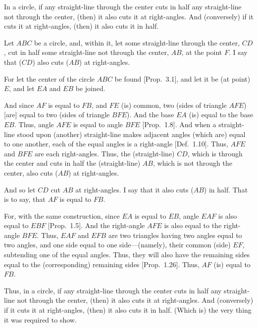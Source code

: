 \begin{Parallel}{}{}
{In a circle, if any straight-line through the center cuts in half any straight-line
not through the center, (then) it also cuts it at right-angles. And (conversely)
if it cuts it at right-angles, (then) it also cuts it in half.

Let $ABC$ be a circle, and, within it, let some straight-line through the center,
$CD$, 
cut in half some straight-line not through the center, $AB$, at the point $F$.
I say that ($CD$) also cuts ($AB$) at right-angles.

For let the center of the circle $ABC$ be found [Prop.~3.1], and let it
be (at point) $E$, and let $EA$ and $EB$ be joined.

And since  $AF$ is equal to $FB$, and $FE$ (is) common, two (sides  of triangle $AFE$) [are] equal to
two (sides of triangle $BFE$). And the base $EA$ (is) equal to the base $EB$. Thus, angle
$AFE$ is equal to angle $BFE$ [Prop.~1.8]. And when a straight-line
stood upon (another) straight-line makes adjacent angles (which are)
equal to one another, each of the equal angles is a right-angle [Def.~1.10].
Thus, $AFE$ and $BFE$ are each right-angles. Thus, the (straight-line) $CD$, which is
through the center
and cuts  in half the (straight-line) $AB$, which is not through the center, also cuts ($AB$) at right-angles.

And so let $CD$ cut $AB$ at right-angles. I say that it also cuts ($AB$) in half.
That is to say, that $AF$ is equal to $FB$.

For, with the same construction, since $EA$ is equal to $EB$, angle $EAF$ is also
equal to $EBF$ [Prop.~1.5]. And the right-angle $AFE$ is also equal to the
right-angle $BFE$. Thus, $EAF$ and $EFB$ are two triangles having two angles
equal to two angles, and one side equal to one side---(namely), their common (side)
$EF$, subtending one of the equal angles. Thus, they will also have the remaining sides equal to the (corresponding) remaining sides [Prop.~1.26]. Thus, $AF$ (is) equal to $FB$.

\epsfysize=2.2in
\centerline{}

Thus, in a circle, if any straight-line through the center cuts in half any straight-line
not through the center, (then) it also cuts it at right-angles. And (conversely)
if it cuts it at right-angles, (then) it also cuts it in half. (Which is) the very thing
it was required to show.}
\end{Parallel}

